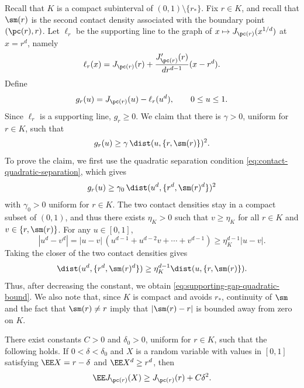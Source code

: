 Recall that $K$ is a compact subinterval of $(0,1)\setminus\{r_*\}$.  Fix
$r\in K$, and recall that $\sm(r)$ is the second contact density associated
with the boundary point $(\pc(r),r)$.  Let $\ell_r$ be the supporting line to
the graph of $x\mapsto J_{\pc(r)}(x^{1/d})$ at $x=r^d$, namely
\[
  \ell_r(x)=J_{\pc(r)}(r)
  +\frac{J_{\pc(r)}'(r)}{d r^{d-1}}(x-r^d).
\]
Define
\begin{equation}\label{eq:supporting-cost-gap}
  g_r(u)=J_{\pc(r)}(u)-\ell_r(u^d),
  \qquad 0\le u\le1.
\end{equation}
Since $\ell_r$ is a supporting line, $g_r\ge0$.  We claim that there is
$\gamma>0$, uniform for $r\in K$, such that
\begin{equation}\label{eq:supporting-gap-quadratic-bound}
  g_r(u)\ge \gamma\,\dist(u,\{r,\sm(r)\})^2.
\end{equation}
To prove the claim, we first use the quadratic separation condition
\eqref{eq:contact-quadratic-separation}, which gives
\[
  g_r(u)\ge \gamma_0\,\dist(u^d,\{r^d,\sm(r)^d\})^2
\]
with $\gamma_0>0$ uniform for $r\in K$.
The two contact densities stay in a compact subset of $(0,1)$, and thus there
exists $\eta_K>0$ such that $v\ge \eta_K$ for all $r\in K$ and
$v\in\{r,\sm(r)\}$.
For any $u\in[0,1]$,
\[
  |u^d-v^d|
  =
  |u-v|\,(u^{d-1}+u^{d-2}v+\cdots+v^{d-1})
  \ge
  \eta_K^{d-1}|u-v|.
\]
Taking the closer of the two contact densities gives
\[
  \dist(u^d,\{r^d,\sm(r)^d\})
  \ge
  \eta_K^{d-1}\dist(u,\{r,\sm(r)\}).
\]
Thus, after decreasing the constant, we obtain \eqref{eq:supporting-gap-quadratic-bound}.  We
also note that, since $K$ is compact and avoids $r_*$, continuity of $\sm$ and
the fact that $\sm(r)\ne r$ imply that $|\sm(r)-r|$ is bounded away from zero
on $K$.

\begin{lemma}\label{lem:scalar-quadratic-bound}
There exist constants $C>0$ and $\delta_0>0$, uniform for $r\in K$, such that
the following holds.  If $0<\delta<\delta_0$ and $X$ is a random variable with
values in $[0,1]$ satisfying
$\EE X=r-\delta$ and
$\EE X^d\ge r^d$,
then
\begin{equation}\label{eq:scalar-quadratic-bound}
  \EE J_{\pc(r)}(X)\ge J_{\pc(r)}(r)+C\delta^2.
\end{equation}
\end{lemma}

